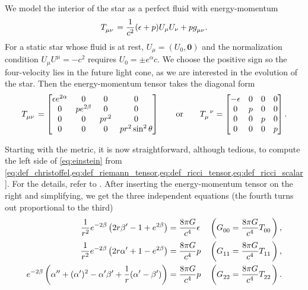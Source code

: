 We model the interior of the star as a perfect fluid with energy-momentum \cite[equation 1.114]{ref:carroll}
\begin{equation}
	T\indices{_\mu_\nu} = \frac{1}{c^2} (\epsilon+p) U_\mu U_\nu + p g\indices{_\mu_\nu}.
	\label{eq:tov:energy_momentum_perfect_fluid}
\end{equation}
For a static star whose fluid is at rest, $U_\mu = (U_0, \textbf{0})$ and the normalization condition $U_\mu U^\mu = -c^2$ requires $U_0 = \pm e^\alpha c$.
We choose the positive sign so the four-velocity lies in the future light cone, as we are interested in the evolution of the star.
Then the energy-momentum tensor takes the diagonal form
\begin{equation}
T\indices{_\mu_\nu} =
\begin{bmatrix}
	\epsilon e^{2\alpha} & 0            & 0     & 0                   \\
	0                    & p e^{2\beta} & 0     & 0                   \\
	0                    & 0            & p r^2 & 0                   \\
	0                    & 0            & 0     & p r^2 \sin^2 \theta \\
\end{bmatrix}
\qquad \text{or} \qquad
T\indices{_\mu^\nu} =
\begin{bmatrix}
	-\epsilon & 0 & 0 & 0 \\
	0         & p & 0 & 0 \\
	0         & 0 & p & 0 \\
	0         & 0 & 0 & p \\
\end{bmatrix}
.
\label{eq:einstein_to_tov:T}
\end{equation}

Starting with the metric, it is now straightforward, although tedious, to compute the left side of \cref{eq:einstein} from \cref{eq:def_christoffel,eq:def_riemann_tensor,eq:def_ricci_tensor,eq:def_ricci_scalar}.
For the details, refer to \cite[equation 5.11-5.15]{ref:carroll}.
After inserting the energy-momentum tensor on the right and simplifying, we get the three independent equations
(the fourth turns out proportional to the third)
\begin{subequations}
\begin{align}
	\frac{1}{r^2} e^{-2 \beta} \left( 2 r \beta' - 1 + e^{2 \beta} \right)                               &= \frac{8 \pi G}{c^4} \epsilon
	&& \left( G\indices{_0_0} = \frac{8 \pi G}{c^4} T\indices{_0_0} \right) , \label{eq:einstein_to_tov:tt} \\
	\frac{1}{r^2} e^{-2 \beta} \left( 2 r \alpha' + 1 - e^{2 \beta} \right)                              &= \frac{8 \pi G}{c^4} p
	&& \left( G\indices{_1_1} = \frac{8 \pi G}{c^4} T\indices{_1_1} \right) , \label{eq:einstein_to_tov:rr} \\
	e^{-2 \beta} \left( \alpha'' + (\alpha')^2 - \alpha' \beta' + \frac{1}{r} (\alpha' - \beta') \right) &= \frac{8 \pi G}{c^4} p
	&& \left( G\indices{_2_2} = \frac{8 \pi G}{c^4} T\indices{_2_2} \right) . \label{eq:einstein_to_tov:thetatheta}
\end{align}
\end{subequations}

